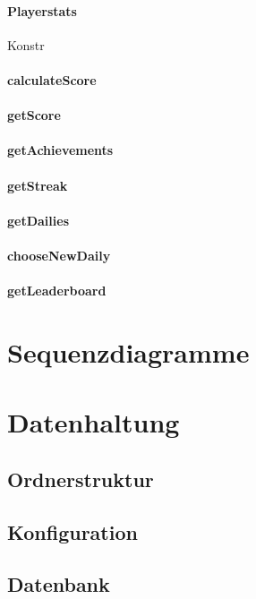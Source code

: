 \documentclass[a4paper]{scrreprt}
\begin{document}
   \subsubsection{Playerstats}
   Konstr
   \subsubsection{calculateScore}
   \subsubsection{getScore}
   \subsubsection{getAchievements}
   \subsubsection{getStreak}
   \subsubsection{getDailies}
   \subsubsection{chooseNewDaily}
   \subsubsection{getLeaderboard}

   \chapter{Sequenzdiagramme}

    \chapter{Datenhaltung}
        \section{Ordnerstruktur}
        \section{Konfiguration}
        \section{Datenbank}
\end{document}
